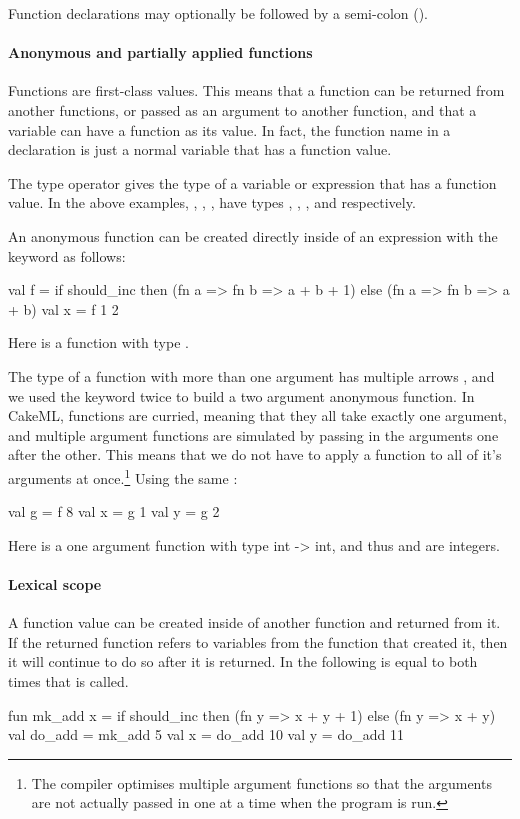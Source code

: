 \documentclass[12pt,a4paper]{book}
\begin{document}
Function declarations may optionally be followed by a semi-colon (\smlinline{;}).

\paragraph{Anonymous and partially applied functions}

Functions are first-class values. This means that a function can be returned
from another functions, or passed as an argument to another function, and that
a variable can have a function as its value. In fact, the function name in a
 declaration is just a normal variable that has a function value.

The \smlinline{->} type operator gives the type of a variable or expression
that has a function value. In the above examples, ,
, ,  have types , , , and
 respectively.

An anonymous function can be created directly inside of an expression with the  keyword as follows:
\begin{smlcode}
val f =
  if should_inc then (fn a => fn b => a + b + 1)
  else (fn a => fn b => a + b)
val x = f 1 2
\end{smlcode}
Here  is a function with type .

The type of a function with more than one argument has multiple
arrows \smlinline{->}, and we used the  keyword twice to build a
two argument anonymous function. In CakeML, functions are curried, meaning that
they all take exactly one argument, and multiple argument functions are
simulated by passing in the arguments one after the other. This means that we do not have to
apply a function to all of it's arguments at once.\footnote{The compiler optimises multiple argument functions so that the arguments are not actually passed in one at a time when the program is run.} Using the same :
\begin{smlcode}
val g = f 8
val x = g 1
val y = g 2
\end{smlcode}
Here  is a one argument function with type {int -> int}, and thus
 and  are integers.

\paragraph{Lexical scope}
A function value can be created inside of another function and returned from
it. If the returned function refers to variables from the function that created
it, then it will continue to do so after it is returned. In the following  is equal to  both times that  is called.
\begin{smlcode}
fun mk_add x =
  if should_inc then (fn y => x + y + 1)
  else (fn y => x + y)
val do_add = mk_add 5
val x = do_add 10
val y = do_add 11
\end{smlcode}
\end{document}
